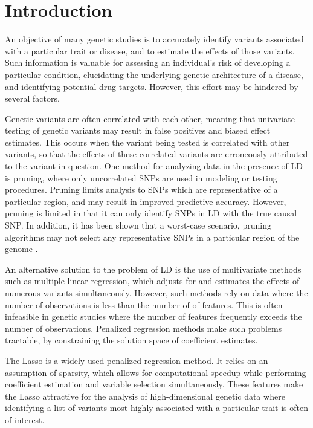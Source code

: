 
\section{Introduction}

An objective of many genetic studies is to accurately identify variants associated with a particular trait or disease, and to estimate the effects of those variants. Such information is valuable for assessing an individual's risk of developing a particular condition, elucidating the underlying genetic architecture of a disease, and identifying potential drug targets. However, this effort may be hindered by several factors. 

Genetic variants are often correlated with each other, meaning that univariate testing of genetic variants may result in false positives and biased effect estimates. This occurs when the variant being tested is correlated with other variants, so that the effects of these correlated variants are erroneously attributed to the variant in question. One method for analyzing data in the presence of LD is pruning, where only uncorrelated SNPs are used in modeling or testing procedures. Pruning limits analysis to SNPs which are representative of a particular region, and may result in improved predictive accuracy. However, pruning is limited in that it can only identify SNPs in LD with the true causal SNP. In addition, it has been shown that a worst-case scenario, pruning algorithms may not select any representative SNPs in a particular region of the genome \cite{prive2018efficient}.

An alternative solution to the problem of LD is the use of multivariate methods such as multiple linear regression, which adjusts for and estimates the effects of numerous variants simultaneously. However, such methods rely on data where the number of observations is less than the number of of features. This is often infeasible in genetic studies where the number of features frequently exceeds the number of observations. Penalized regression methods make such problems tractable, by constraining the solution space of coefficient estimates.

The Lasso \cite{tibshirani1996regression} is a widely used penalized regression method. It relies on an assumption of sparsity, which allows for computational speedup while performing coefficient estimation and variable selection simultaneously. These features make the Lasso attractive for the analysis of high-dimensional genetic data where identifying a list of variants most highly associated with a particular trait is often of interest.

